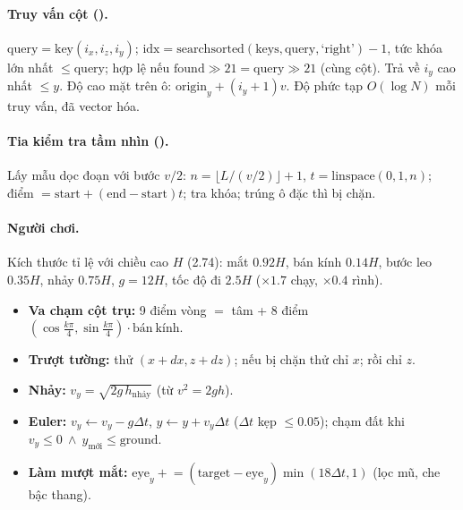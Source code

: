 \paragraph{Truy vấn cột ().}
$\mathrm{query}=\mathrm{key}(i_x,i_z,i_y)$; $\mathrm{idx}=\mathrm{searchsorted}(\mathrm{keys},\mathrm{query},\text{`right'})-1$, tức khóa lớn nhất $\le\mathrm{query}$; hợp lệ nếu $\mathrm{found}\gg21=\mathrm{query}\gg21$ (cùng cột). Trả về $i_y$ cao nhất $\le y$. Độ cao mặt trên ô: $\mathrm{origin}_y+(i_y+1)v$. Độ phức tạp $O(\log N)$ mỗi truy vấn, đã vector hóa.

\paragraph{Tia kiểm tra tầm nhìn ().}
Lấy mẫu dọc đoạn với bước $v/2$: $n=\lfloor L/(v/2)\rfloor+1$, $t=\mathrm{linspace}(0,1,n)$; điểm $=\mathrm{start}+(\mathrm{end}-\mathrm{start})t$; tra khóa; trúng ô đặc thì bị chặn.

\paragraph{Người chơi.}
Kích thước tỉ lệ với chiều cao $H$ (2.74): mắt $0.92H$, bán kính $0.14H$, bước leo $0.35H$, nhảy $0.75H$, $g=12H$, tốc độ đi $2.5H$ ($\times1.7$ chạy, $\times0.4$ rình).
\begin{itemize}
\item \textbf{Va chạm cột trụ:} 9 điểm vòng  $=$ tâm + 8 điểm $(\cos\frac{k\pi}{4},\sin\frac{k\pi}{4})\cdot\mathrm{bán\ kính}$.
\item \textbf{Trượt tường:} thử $(x+dx,z+dz)$; nếu bị chặn thử chỉ $x$; rồi chỉ $z$.
\item \textbf{Nhảy:} $v_y=\sqrt{2g\,h_{\mathrm{nhảy}}}$ (từ $v^2=2gh$).
\item \textbf{Euler:} $v_y\leftarrow v_y-g\Delta t$, $y\leftarrow y+v_y\Delta t$ ($\Delta t$ kẹp $\le0.05$); chạm đất khi $v_y\le0\ \land\ y_{\mathrm{mới}}\le\mathrm{ground}$.
\item \textbf{Làm mượt mắt:} $\mathrm{eye}_y\mathrel{+}=(\mathrm{target}-\mathrm{eye}_y)\min(18\Delta t,1)$ (lọc mũ, che bậc thang).
\end{itemize}
